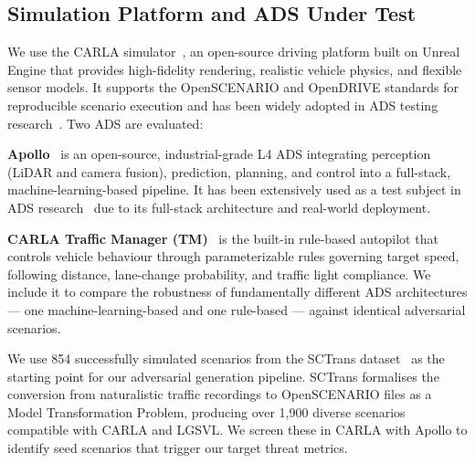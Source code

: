 \subsection{Simulation Platform and ADS Under Test}\label{sec:platform_ads}

We use the CARLA simulator~\cite{dosovitskiy_carla_2017}, an open-source driving platform built on Unreal Engine that provides high-fidelity rendering, realistic vehicle physics, and flexible sensor models. It supports the OpenSCENARIO and OpenDRIVE standards for reproducible scenario execution and has been widely adopted in ADS testing research~\cite{kim_drivefuzz_2022, yan_-demand_2025, li_av-fuzzer_2020}. Two ADS are evaluated:

\textbf{Apollo}~\cite{noauthor_apollo_nodate} is an open-source, industrial-grade L4 ADS integrating perception (LiDAR and camera fusion), prediction, planning, and control into a full-stack, machine-learning-based pipeline. It has been extensively used as a test subject in ADS research~\cite{dai_sctrans_2024, kim_drivefuzz_2022, yan_-demand_2025} due to its full-stack architecture and real-world deployment.

\textbf{CARLA Traffic Manager (TM)}~\cite{dosovitskiy_carla_2017} is the built-in rule-based autopilot that controls vehicle behaviour through parameterizable rules governing target speed, following distance, lane-change probability, and traffic light compliance. We include it to compare the robustness of fundamentally different ADS architectures --- one machine-learning-based and one rule-based --- against identical adversarial scenarios.

We use 854 successfully simulated scenarios from the SCTrans dataset~\cite{dai_sctrans_2024} as the starting point for our adversarial generation pipeline. SCTrans formalises the conversion from naturalistic traffic recordings to OpenSCENARIO files as a Model Transformation Problem, producing over 1,900 diverse scenarios compatible with CARLA and LGSVL. We screen these in CARLA with Apollo to identify seed scenarios that trigger our target threat metrics.

